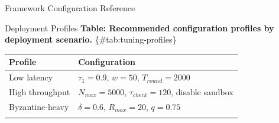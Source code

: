 \documentclass[
  ignorenonframetext,
]{beamer}
\newcounter{none} %
\begin{document}
\begin{frame}[fragile]{Framework Configuration Reference}
\begin{block}{Deployment Profiles}
\protect{}\label{sec:tuning-profiles}
\textbf{Table: Recommended configuration profiles by deployment
scenario.} \{\#tab:tuning-profiles\}

{\def\LTcaptype{none} %
\begin{longtable}[]{@{}
  >{\raggedright\arraybackslash}p{}
  >{\raggedright\arraybackslash}p{}@{}}
\toprule\noalign{}
\begin{minipage}[b]{\linewidth}\raggedright
Profile
\end{minipage} & \begin{minipage}[b]{\linewidth}\raggedright
Configuration
\end{minipage} \\
\midrule\noalign{}
\endhead
Low latency & \(\tau_1 = 0.9\), \(w = 50\), \(T_{round} = 2000\) \\
High throughput & \(N_{max} = 5000\), \(\tau_{check} = 120\), disable
sandbox \\
Byzantine-heavy & \(\delta = 0.6\), \(R_{max} = 20\), \(q = 0.75\) \\
\bottomrule\noalign{}
\end{longtable}
}
\end{block}
\end{frame}
\end{document}
